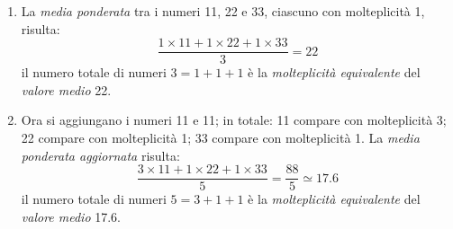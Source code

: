\documentclass[12pt,a4paper]{article}
\begin{document}
\begin{enumerate}
\item  La  \emph{media  ponderata}  tra  i  numeri  \num{11},  \num{22}  e  \num{33},  ciascuno  con
  molteplicità \num{1}, risulta:
  \begin{equation*}
    \frac{\num{1} \times{} \num{11}
       + \num{1} \times{} \num{22}
       + \num{1} \times{} \num{33}}{\num{3}}
    = \num{22}
  \end{equation*}
  il numero  totale di  numeri \(\num{3}  = \num{1} +  \num{1} +  \num{1}\) è  la \emph{molteplicità
     equivalente} del \emph{valore medio} \num{22}.

\item Ora si aggiungano  i numeri \num{11} e \num{11}; in totale:  \num{11} compare con molteplicità
  \num{3}; \num{22} compare con molteplicità \num{1}; \num{33} compare con molteplicità \num{1}.  La
  \emph{media ponderata aggiornata} risulta:
  \begin{equation*}
    \frac{\num{3} \times{} \num{11}
       + \num{1} \times{} \num{22}
       + \num{1} \times{} \num{33}}{\num{5}}
    = \frac{\num{88}}{\num{5}} \simeq \num{17,6}
  \end{equation*}
  il numero  totale di  numeri \(\num{5}  = \num{3} +  \num{1} +  \num{1}\) è  la \emph{molteplicità
     equivalente} del \emph{valore medio} \num{17,6}.


\end{enumerate}
\end{document}
